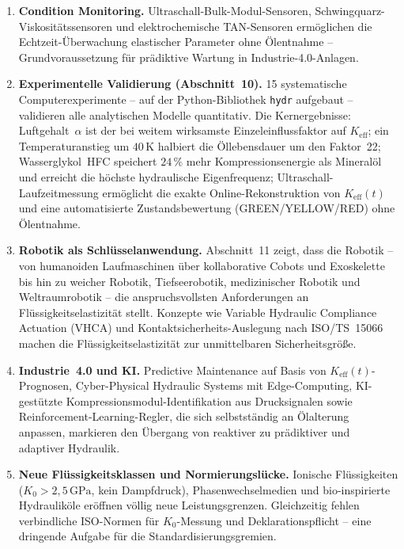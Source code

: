 ﻿\documentclass[a4paper,12pt]{scrreprt}
\theoremstyle{definition}
\begin{document}
\begin{enumerate}
  \item \textbf{Condition Monitoring.}
    Ultraschall-Bulk-Modul-Sensoren, Schwingquarz-Viskosi\-tätssensoren und
    elektrochemische TAN-Sensoren ermöglichen die Echtzeit-Über\-wachung
    elastischer Parameter ohne Ölentnahme -- Grundvoraussetzung für
    prädiktive Wartung in Industrie-4.0-Anlagen.

  \item \textbf{Experimentelle Validierung (Abschnitt~10).}
    15 systematische Computerexperimente -- auf der Python-Bibliothek
    \texttt{hydr} aufgebaut -- validieren alle analytischen Modelle
    quantitativ. Die Kernergebnisse: Luftgehalt~$\alpha$ ist der
    bei weitem wirksamste Einzeleinflussfaktor auf $K_{\mathrm{eff}}$;
    ein Temperaturanstieg um $40\,\mathrm{K}$ halbiert die Öllebensdauer
    um den Faktor~22; Wasserglykol~HFC speichert $24\,\%$ mehr
    Kompressionsenergie als Mineralöl und erreicht die höchste
    hydraulische Eigenfrequenz; Ultraschall-Laufzeitmessung ermöglicht
    die exakte Online-Rekonstruktion von $K_{\mathrm{eff}}(t)$ und
    eine automatisierte Zustandsbewertung (GREEN/YELLOW/RED) ohne
    Ölentnahme.

  \item \textbf{Robotik als Schlüsselanwendung.}
    Abschnitt~11 zeigt, dass die Robotik -- von humanoiden Laufmaschinen
    über kollaborative Cobots und Exoskelette bis hin zu weicher Robotik,
    Tiefseerobotik, medizinischer Robotik und Weltraumrobotik -- die
    anspruchsvollsten Anforderungen an Flüssigkeitselastizität stellt.
    Konzepte wie Variable Hydraulic Compliance Actuation (VHCA) und
    Kontaktsicherheits-Auslegung nach ISO/TS~15066 machen die
    Flüssigkeitselastizität zur unmittelbaren Sicherheitsgröße.

  \item \textbf{Industrie~4.0 und KI.}
    Predictive Maintenance auf Basis von $K_\mathrm{eff}(t)$-Prognosen,
    Cyber-Physical Hydraulic Systems mit Edge-Computing, KI-gestützte
    Kompressions\-modul-Identifikation aus Drucksignalen sowie
    Reinforcement-Learning-Regler, die sich selbstständig an Ölalterung
    anpassen, markieren den Übergang von reaktiver zu prädiktiver
    und adaptiver Hydraulik.

  \item \textbf{Neue Flüssigkeitsklassen und Normierungslücke.}
    Ionische Flüssigkeiten ($K_0 > 2{,}5\,\mathrm{GPa}$, kein Dampfdruck),
    Phasenwechselmedien und bio-inspirierte Hydrauliköle eröffnen
    völlig neue Leistungsgrenzen. Gleichzeitig fehlen verbindliche
    ISO-Normen für $K_0$-Messung und Deklarationspflicht -- eine
    dringende Aufgabe für die Standardisierungsgremien.
\end{enumerate}
\end{document}
